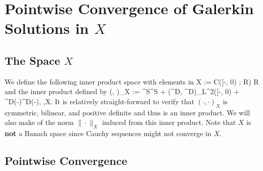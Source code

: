 
\section{Pointwise Convergence of Galerkin Solutions in \(X\)}

\subsection{The Space \(X\)}

We define the following inner product space with elements in 
\be
    X := \mathcal C([-\tau, 0) ; \mathbb R) \times \mathbb R
\ee
and the inner product defined by
\be
    (\Phi, \Psi)_X := \Phi^S\Psi^S +  \tau (\Phi^D, \Psi^D)_{L^2([-\tau, 0)} + \Phi^D(-\tau)\Psi^D(-\tau), \quad \Phi,\Psi\in X.
\ee
It is relatively straight-forward to verify that \((\cdot, \cdot)_X\) is symmetric, bilinear, and positive definite and thus is an inner product. We will also make of the norm \(\|\cdot\|_X\) induced from this inner product. Note that \(X\) is \textbf{not} a Banach space since Cauchy sequences might not converge in \(X\).

\subsection{Pointwise Convergence}

